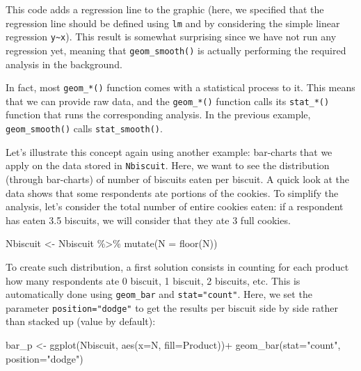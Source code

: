 \documentclass[
]{book}
\newenvironment{Shaded}{\begin{snugshade}}{\end{snugshade}}
\newcommand{\AttributeTok}[1]{\textcolor[rgb]{0.77,0.63,0.00}{#1}}
\newcommand{\FunctionTok}[1]{\textcolor[rgb]{0.00,0.00,0.00}{#1}}
\newcommand{\NormalTok}[1]{#1}
\newcommand{\OtherTok}[1]{\textcolor[rgb]{0.56,0.35,0.01}{#1}}
\newcommand{\SpecialCharTok}[1]{\textcolor[rgb]{0.00,0.00,0.00}{#1}}
\newcommand{\StringTok}[1]{\textcolor[rgb]{0.31,0.60,0.02}{#1}}
\begin{document}
This code adds a regression line to the graphic (here, we specified that the regression line should be defined using \texttt{lm} and by considering the simple linear regression \texttt{y\textasciitilde{}x}). This result is somewhat surprising since we have not run any regression yet, meaning that \texttt{geom\_smooth()} is actually performing the required analysis in the background.

In fact, most \texttt{geom\_*()} function comes with a statistical process to it. This means that we can provide raw data, and the \texttt{geom\_*()} function calls its \texttt{stat\_*()} function that runs the corresponding analysis. In the previous example, \texttt{geom\_smooth()} calls \texttt{stat\_smooth()}.

Let's illustrate this concept again using another example: bar-charts that we apply on the data stored in \texttt{Nbiscuit}.
Here, we want to see the distribution (through bar-charts) of number of biscuits eaten per biscuit. A quick look at the data shows that some respondents ate portions of the cookies. To simplify the analysis, let's consider the total number of entire cookies eaten: if a respondent has eaten 3.5 biscuits, we will consider that they ate 3 full cookies.

\begin{Shaded}
\begin{Highlighting}[]
\NormalTok{Nbiscuit }\OtherTok{\textless{}{-}}\NormalTok{ Nbiscuit }\SpecialCharTok{\%\textgreater{}\%} 
  \FunctionTok{mutate}\NormalTok{(}\AttributeTok{N =} \FunctionTok{floor}\NormalTok{(N))}
\end{Highlighting}
\end{Shaded}

To create such distribution, a first solution consists in counting for each product how many respondents ate 0 biscuit, 1 biscuit, 2 biscuits, etc. This is automatically done using \texttt{geom\_bar} and \texttt{stat="count"}. Here, we set the parameter \texttt{position="dodge"} to get the results per biscuit side by side rather than stacked up (value by default):

\begin{Shaded}
\begin{Highlighting}[]
\NormalTok{bar\_p }\OtherTok{\textless{}{-}} \FunctionTok{ggplot}\NormalTok{(Nbiscuit, }\FunctionTok{aes}\NormalTok{(}\AttributeTok{x=}\NormalTok{N, }\AttributeTok{fill=}\NormalTok{Product))}\SpecialCharTok{+}
  \FunctionTok{geom\_bar}\NormalTok{(}\AttributeTok{stat=}\StringTok{"count"}\NormalTok{, }\AttributeTok{position=}\StringTok{"dodge"}\NormalTok{)}
\end{Highlighting}
\end{Shaded}
\end{document}
